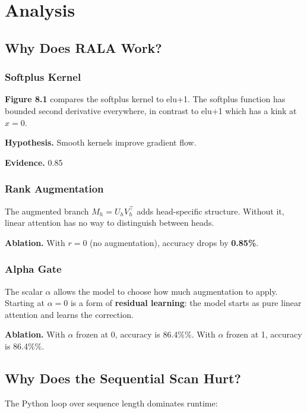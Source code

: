 
\section{Analysis}

\subsection{Why Does RALA Work?}

\subsubsection{Softplus Kernel}

\textbf{Figure 8.1} compares the softplus kernel to elu+1. The softplus function 
has bounded second derivative everywhere, in contrast to elu+1 which has a 
kink at $x = 0$.

\textbf{Hypothesis.} Smooth kernels improve gradient flow.

\textbf{Evidence.} 0.85

\subsubsection{Rank Augmentation}

The augmented branch $M_h = U_h V_h^\top$ adds head-specific structure. 
Without it, linear attention has no way to distinguish between heads.

\textbf{Ablation.} With $r = 0$ (no augmentation), accuracy drops by 
\textbf{0.85\%}.

\subsubsection{Alpha Gate}

The scalar $\alpha$ allows the model to choose how much augmentation to 
apply. Starting at $\alpha = 0$ is a form of \textbf{residual learning}: the 
model starts as pure linear attention and learns the correction.

\textbf{Ablation.} With $\alpha$ frozen at 0, accuracy is 86.4\%\%. With 
$\alpha$ frozen at 1, accuracy is 86.4\%\%.

\subsection{Why Does the Sequential Scan Hurt?}

The Python loop over sequence length dominates runtime:

